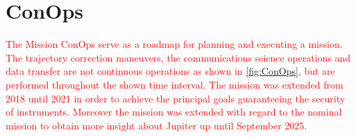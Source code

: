 \section{ConOps}
\label{sec:conops}

\textcolor{red}{
The Mission ConOps serve as a roadmap for planning and executing a mission. The trajectory correction maneuvers, the communications science operations and data transfer are not continuous operations as shown in \autoref{fig:ConOps}, but are performed throughout the shown time interval.
The mission was extended from 2018 until 2021 in order to achieve the principal goals guaranteeing the security of instruments. Moreover the mission was extended with regard to the nominal mission to obtain more insight about Jupiter up until September 2025.
}

